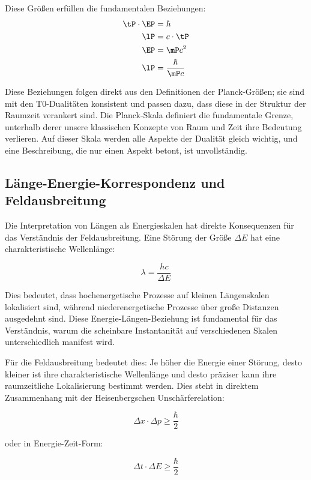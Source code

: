 	Diese Größen erfüllen die fundamentalen Beziehungen:
	\begin{align}
		\tP \cdot \EP &= \hbar \\
		\lP &= c \cdot \tP \\
		\EP &= \mP c^2 \\
		\lP &= \frac{\hbar}{\mP c}
	\end{align}
	
	Diese Beziehungen folgen direkt aus den Definitionen der Planck-Größen; sie sind mit den T0-Dualitäten konsistent und passen dazu, dass diese in der Struktur der Raumzeit verankert sind. Die Planck-Skala definiert die fundamentale Grenze, unterhalb derer unsere klassischen Konzepte von Raum und Zeit ihre Bedeutung verlieren. Auf dieser Skala werden alle Aspekte der Dualität gleich wichtig, und eine Beschreibung, die nur einen Aspekt betont, ist unvollständig.
	
	\subsection{Länge-Energie-Korrespondenz und Feldausbreitung}
	
	Die Interpretation von Längen als Energieskalen hat direkte Konsequenzen für das Verständnis der Feldausbreitung. Eine Störung der Größe $\Delta E$ hat eine charakteristische Wellenlänge:
	
	\begin{equation}
		\lambda = \frac{hc}{\Delta E}
	\end{equation}
	
	Dies bedeutet, dass hochenergetische Prozesse auf kleinen Längenskalen lokalisiert sind, während niederenergetische Prozesse über große Distanzen ausgedehnt sind. Diese Energie-Längen-Beziehung ist fundamental für das Verständnis, warum die scheinbare Instantanität auf verschiedenen Skalen unterschiedlich manifest wird.
	
	Für die Feldausbreitung bedeutet dies: Je höher die Energie einer Störung, desto kleiner ist ihre charakteristische Wellenlänge und desto präziser kann ihre raumzeitliche Lokalisierung bestimmt werden. Dies steht in direktem Zusammenhang mit der Heisenbergschen Unschärferelation:
	
	\begin{equation}
		\Delta x \cdot \Delta p \geq \frac{\hbar}{2}
	\end{equation}
	
	oder in Energie-Zeit-Form:
	
	\begin{equation}
		\Delta t \cdot \Delta E \geq \frac{\hbar}{2}
	\end{equation}
	
